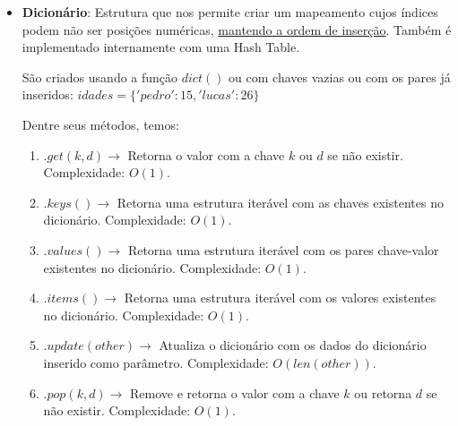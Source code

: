 \documentclass[11pt, a4paper]{article}
\begin{document}
\begin{itemize}
\begin{enumerate}
        \item \(.difference([others]) \rightarrow\) Retorna a diferença entre esse conjunto e os outros. Pode ser chamado com o operador \(\-\). Complexidade: \(O(N)\).

        \item \(.symetric\_difference([others]) \rightarrow\) Retorna a diferença simétrica dos conjuntos (elementos que só estão em um dos conjuntos). Pode ser chamado com o operador \(\wedge\). Complexidade: \(O(N+len(others))\).
    \end{enumerate}

    \item \textbf{Dicionário}: Estrutura que nos permite criar um mapeamento cujos índices podem não ser posições numéricas, \href{https://discuss.python.org/t/are-dict-class-dictionaries-ordered/38172}{mantendo a ordem de inserção}. Também é implementado internamente com uma Hash Table.
    
    São criados usando a função \(dict()\) ou com chaves vazias ou com os pares já inseridos: \(idades = \{'pedro': 15, 'lucas': 26\}\)

    Dentre seus métodos, temos:
    \begin{enumerate}
        \item \(.get(k,d) \rightarrow\) Retorna o valor com a chave \(k\) ou \(d\) se não existir. Complexidade: \(O(1)\).
        
        \item \(.keys() \rightarrow\) Retorna uma estrutura iterável com as chaves existentes no dicionário. Complexidade: \(O(1)\).

        \item \(.values() \rightarrow\) Retorna uma estrutura iterável com os pares chave-valor existentes no dicionário. Complexidade: \(O(1)\).

        \item \(.items() \rightarrow\) Retorna uma estrutura iterável com os valores existentes no dicionário. Complexidade: \(O(1)\).

        \item \(.update(other) \rightarrow\) Atualiza o dicionário com os dados do dicionário inserido como parâmetro. Complexidade: \(O(len(other))\).

        \item \(.pop(k,d) \rightarrow\) Remove e retorna o valor com a chave \(k\) ou retorna \(d\) se não existir. Complexidade: \(O(1)\).
    \end{enumerate}
\end{itemize}
\end{document}

